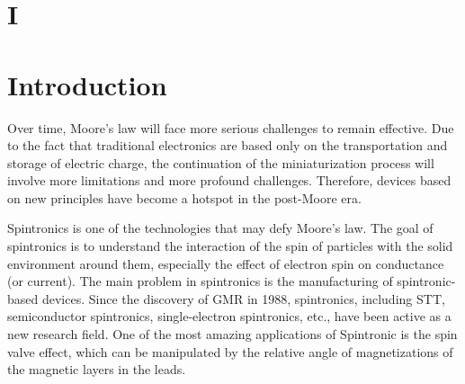 \documentclass[twoside,twocolumn,9pt]{article}
\begin{document}
\section*{I}
\vspace{-1cm}


\section{Introduction}
Over time, Moore's law will face more serious challenges to remain effective. Due to the fact that traditional electronics are based only on the transportation and storage of electric charge, the continuation of the miniaturization process will involve more limitations and more profound challenges. Therefore, devices based on new principles have become a hotspot in the post-Moore era\cite{zhu2023recent,zhou2020defect}. 

Spintronics is one of the technologies that may defy Moore's law. The goal of spintronics is to understand the interaction of the spin of particles with the solid environment around them, especially the effect of electron spin on conductance (or current). The main problem in spintronics is the manufacturing of spintronic-based devices. Since the discovery of GMR in 1988\cite{baibich1988giant, binasch1989enhanced}, spintronics, including STT\cite{zutic2004spintronics,fert2008nobel}, semiconductor spintronics, single-electron spintronics, etc., have been active as a new research field. One of the most amazing applications of Spintronic is the spin valve effect\cite{zutic2004spintronics}, which can be manipulated by the relative angle of magnetizations of the magnetic layers in the leads. 
\end{document}
